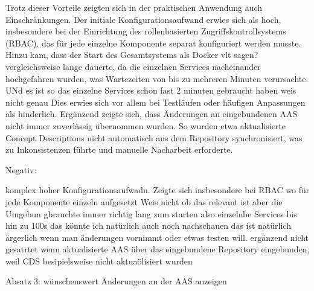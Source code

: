 Trotz dieser Vorteile zeigten sich in der praktischen Anwendung auch Einschränkungen. 
Der initiale Konfigurationsaufwand erwies sich als hoch, insbesondere bei der Einrichtung des rollenbasierten Zugriffskontrollsystems (RBAC), das für jede einzelne Komponente separat konfiguriert werden musste. 
Hinzu kam, dass der Start des Gesamtsystems als Docker vlt sagen? vergleichsweise lange dauerte, da die einzelnen Services nacheinander hochgefahren wurden, was Wartezeiten von bis zu mehreren Minuten verursachte. 
UNd es ist so das einzelne Services schon fast 2 minuten gebraucht haben weis nicht genau
Dies erwies sich vor allem bei Testläufen oder häufigen Anpassungen als hinderlich. 
Ergänzend zeigte sich, dass Änderungen an eingebundenen AAS nicht immer zuverlässig übernommen wurden. So wurden etwa aktualisierte Concept Descriptions nicht automatisch aus dem Repository synchronisiert, was zu Inkonsistenzen führte und manuelle Nacharbeit erforderte.

Negativ:

komplex hoher Konfigurationsaufwadn.
Zeigte sich insbesondere bei RBAC wo für jede Komponente einzeln aufgesetzt
Weis nicht ob das relevant ist aber die Umgebun gbrauchte immer richtig lang zum starten also einzelnbe Services bis hin zu 100s das könnte ich natürlich auch noch nachschauen 
das ist natürlich ärgerlich wenn man änderungen vornimmt oder etwas testen will.
ergänzend nicht gesatrtet wenn aktualisierte AAS über das eingebundene Repository eingebunden, weil CDS besipielsweise nicht aktuaölisiert wurden



Absatz 3: wünschenswert Änderungen an der AAS anzeigen 
